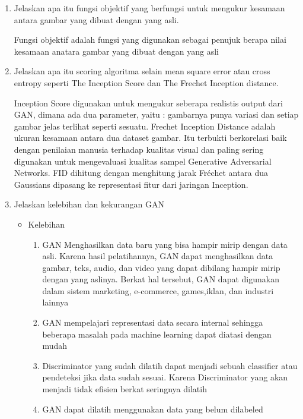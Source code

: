 \begin{enumerate}
            \item Jelaskan apa itu fungsi objektif yang berfungsi untuk mengukur kesamaan antara gambar yang dibuat dengan yang asli.
            \par Fungsi objektif adalah fungsi yang digunakan sebagai penujuk berapa nilai kesamaan anatara gambar yang dibuat dengan yang asli

            \item Jelaskan apa itu scoring algoritma selain mean square error atau cross entropy seperti The Inception Score dan The Frechet Inception distance.
            \par Inception Score digunakan untuk mengukur seberapa realistis output dari GAN, dimana ada dua parameter, yaitu : gambarnya punya variasi dan setiap gambar jelas terlihat seperti sesuatu. Frechet Inception Distance adalah ukuran kesamaan antara dua dataset gambar. Itu terbukti berkorelasi baik dengan penilaian manusia terhadap kualitas visual dan paling sering digunakan untuk mengevaluasi kualitas sampel Generative Adversarial Networks. FID dihitung dengan menghitung jarak Fréchet antara dua Gaussians dipasang ke representasi fitur dari jaringan Inception.
            
            \item Jelaskan kelebihan dan kekurangan GAN
            \begin{itemize}
              \item Kelebihan 
              \begin{enumerate}
               
                \item GAN Menghasilkan data baru yang bisa hampir mirip dengan data asli. Karena hasil pelatihannya, GAN dapat menghasilkan data gambar, teks, audio, dan video yang dapat dibilang hampir mirip dengan yang aslinya. Berkat hal tersebut, GAN dapat digunakan dalam sistem marketing, e-commerce, games,iklan, dan industri lainnya
                \item GAN mempelajari representasi data secara internal sehingga beberapa masalah pada machine learning dapat diatasi dengan mudah
                \item Discriminator yang sudah dilatih dapat menjadi sebuah classifier atau pendeteksi jika data sudah sesuai. Karena Discriminator yang akan menjadi tidak efisien berkat seringnya dilatih
                \item GAN dapat dilatih menggunakan data yang belum dilabeled
              

\end{enumerate}
\end{itemize}
\end{enumerate}
